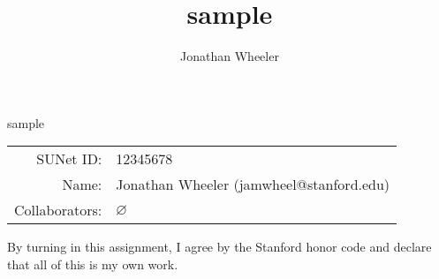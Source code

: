\documentclass[notitlepage]{jmwhw}
\author{Jonathan Wheeler} %
\title{sample} %
\begin{document}

\begin{titlepage}
	\begin{center}
		{\Large sample} %
		
		\bigskip

		\begin{tabular}{rl}
			SUNet ID: & 12345678 \\ %
			Name: & Jonathan Wheeler (jamwheel@stanford.edu) \\ %
			Collaborators: & $\varnothing$
		\end{tabular}

		\bigskip

	\end{center}

	\toccontents

	\vfill

	\begin{center}
		\parbox{10cm}{
		By turning in this assignment, I agree by the Stanford honor code and
		declare that all of this is my own work.
		}
	\end{center}
\end{titlepage}



\end{document}
